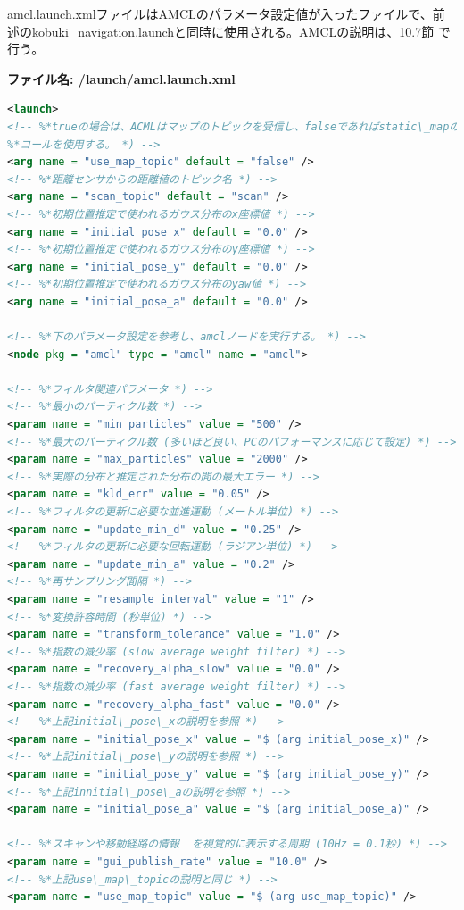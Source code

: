 amcl.launch.xmlファイルはAMCLのパラメータ設定値が入ったファイルで、前述のkobuki\_navigation.launchと同時に使用される。AMCLの説明は、10.7節  で行う。

\textbf{ファイル名: /launch/amcl.launch.xml}
\begin{lstlisting}[language=XML]
<launch>
<!-- %*trueの場合は、ACMLはマップのトピックを受信し、falseであればstatic\_mapのサービス*)
%*コールを使用する。 *) -->
<arg name = "use_map_topic" default = "false" />
<!-- %*距離センサからの距離値のトピック名 *) -->
<arg name = "scan_topic" default = "scan" />
<!-- %*初期位置推定で使われるガウス分布のx座標値 *) -->
<arg name = "initial_pose_x" default = "0.0" />
<!-- %*初期位置推定で使われるガウス分布のy座標値 *) -->
<arg name = "initial_pose_y" default = "0.0" />
<!-- %*初期位置推定で使われるガウス分布のyaw値 *) -->
<arg name = "initial_pose_a" default = "0.0" />

<!-- %*下のパラメータ設定を参考し、amclノードを実行する。 *) -->
<node pkg = "amcl" type = "amcl" name = "amcl">

<!-- %*フィルタ関連パラメータ *) -->
<!-- %*最小のパーティクル数 *) -->
<param name = "min_particles" value = "500" />
<!-- %*最大のパーティクル数 (多いほど良い、PCのパフォーマンスに応じて設定) *) -->
<param name = "max_particles" value = "2000" />
<!-- %*実際の分布と推定された分布の間の最大エラー *) -->
<param name = "kld_err" value = "0.05" />
<!-- %*フィルタの更新に必要な並進運動 (メートル単位) *) -->
<param name = "update_min_d" value = "0.25" />
<!-- %*フィルタの更新に必要な回転運動 (ラジアン単位) *) -->
<param name = "update_min_a" value = "0.2" />
<!-- %*再サンプリング間隔 *) -->
<param name = "resample_interval" value = "1" />
<!-- %*変換許容時間 (秒単位) *) -->
<param name = "transform_tolerance" value = "1.0" />
<!-- %*指数の減少率 (slow average weight filter) *) -->
<param name = "recovery_alpha_slow" value = "0.0" />
<!-- %*指数の減少率 (fast average weight filter) *) -->
<param name = "recovery_alpha_fast" value = "0.0" />
<!-- %*上記initial\_pose\_xの説明を参照 *) -->
<param name = "initial_pose_x" value = "$ (arg initial_pose_x)" />
<!-- %*上記initial\_pose\_yの説明を参照 *) -->
<param name = "initial_pose_y" value = "$ (arg initial_pose_y)" />
<!-- %*上記innitial\_pose\_aの説明を参照 *) -->
<param name = "initial_pose_a" value = "$ (arg initial_pose_a)" />

<!-- %*スキャンや移動経路の情報  を視覚的に表示する周期 (10Hz = 0.1秒) *) -->
<param name = "gui_publish_rate" value = "10.0" />
<!-- %*上記use\_map\_topicの説明と同じ *) -->
<param name = "use_map_topic" value = "$ (arg use_map_topic)" />


\end{lstlisting}
